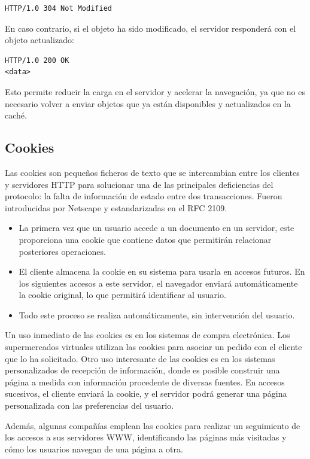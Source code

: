 \documentclass[a4paper,12pt]{article}
\begin{document}
\begin{verbatim}
HTTP/1.0 304 Not Modified
\end{verbatim}

En caso contrario, si el objeto ha sido modificado, el servidor responderá con el objeto actualizado:

\begin{verbatim}
HTTP/1.0 200 OK
<data>
\end{verbatim}

Esto permite reducir la carga en el servidor y acelerar la navegación, ya que no es necesario volver a enviar objetos que ya están disponibles y actualizados en la caché.

\subsection{Cookies}

Las cookies son pequeños ficheros de texto que se intercambian entre los clientes y servidores HTTP para solucionar una de las principales deficiencias del protocolo: la falta de información de estado entre dos transacciones. Fueron introducidas por Netscape y estandarizadas en el RFC 2109.

\begin{itemize}
    \item La primera vez que un usuario accede a un documento en un servidor, este proporciona una cookie que contiene datos que permitirán relacionar posteriores operaciones.
    \item El cliente almacena la cookie en su sistema para usarla en accesos futuros. En los siguientes accesos a este servidor, el navegador enviará automáticamente la cookie original, lo que permitirá identificar al usuario.
    \item Todo este proceso se realiza automáticamente, sin intervención del usuario.
\end{itemize}

Un uso inmediato de las cookies es en los sistemas de compra electrónica. Los supermercados virtuales utilizan las cookies para asociar un pedido con el cliente que lo ha solicitado. Otro uso interesante de las cookies es en los sistemas personalizados de recepción de información, donde es posible construir una página a medida con información procedente de diversas fuentes. En accesos sucesivos, el cliente enviará la cookie, y el servidor podrá generar una página personalizada con las preferencias del usuario.

Además, algunas compañías emplean las cookies para realizar un seguimiento de los accesos a sus servidores WWW, identificando las páginas más visitadas y cómo los usuarios navegan de una página a otra.
\end{document}
